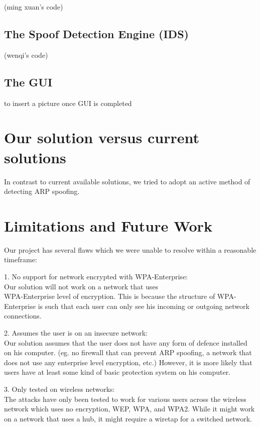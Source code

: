 \documentclass{acm_proc_article-sp}
\begin{document}
(ming xuan's code) 

\subsection{The Spoof Detection Engine (IDS)}

(wenqi's code)

\subsection{The GUI}

to insert a picture once GUI is completed

\section{Our solution versus current \\solutions}
In contrast to current available solutions, we tried to adopt an active method of detecting ARP spoofing. 

\section{Limitations and Future Work}
Our project has several flaws which we were unable to resolve within a reasonable timeframe: 

1. No support for network encrypted with WPA-Enterprise:\\
Our solution will not work on a network that uses\\ WPA-Enterprise level of encryption. This is because the structure of WPA-Enterprise is such that each user can only see his incoming or outgoing network connections. 

2. Assumes the user is on an insecure network: \\
Our solution assumes that the user does not have any form of defence installed on his computer. (eg. no firewall that can prevent ARP spoofing, a network that does not use any enterprise level encryption, etc.) However, it is more likely that users have at least some kind of basic protection system on his computer. 

3. Only tested on wireless networks:\\
The attacks have only been tested to work for various users across the wireless network which uses no encryption, WEP, WPA, and WPA2. While it might work on a network that uses a hub, it might require a wiretap for a switched network.  
\end{document}
